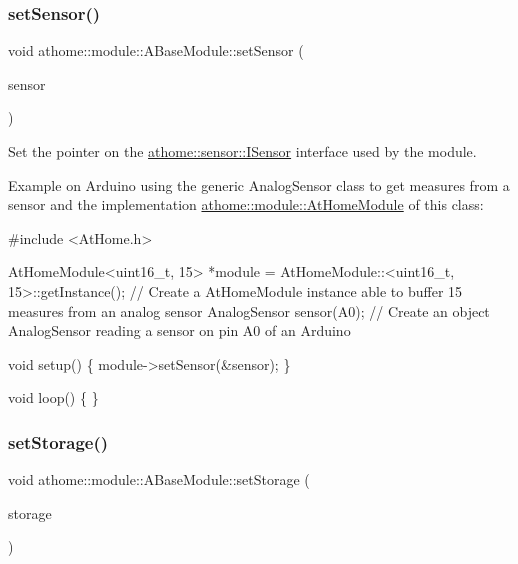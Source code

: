 \subsubsection{\texorpdfstring{set\+Sensor()}{setSensor()}}
{\footnotesize\ttfamily void athome\+::module\+::\+A\+Base\+Module\+::set\+Sensor (\begin{DoxyParamCaption}\item[{\mbox{\hyperlink{classathome_1_1sensor_1_1_i_sensor}{sensor\+::\+I\+Sensor}} $\ast$}]{sensor }\end{DoxyParamCaption})}

Set the pointer on the \mbox{\hyperlink{classathome_1_1sensor_1_1_i_sensor}{athome\+::sensor\+::\+I\+Sensor}} interface used by the module.

Example on Arduino using the generic Analog\+Sensor class to get measures from a sensor and the implementation \mbox{\hyperlink{classathome_1_1module_1_1_at_home_module}{athome\+::module\+::\+At\+Home\+Module}} of this class\+:


\begin{DoxyCode}
\textcolor{preprocessor}{#include <AtHome.h>}

AtHomeModule<uint16\_t, 15> *module = AtHomeModule::<uint16\_t, 15>::getInstance(); \textcolor{comment}{// Create a AtHomeModule
       instance able to buffer 15 measures from an analog sensor}
AnalogSensor sensor(A0); \textcolor{comment}{// Create an object AnalogSensor reading a sensor on pin A0 of an Arduino}

\textcolor{keywordtype}{void} setup() \{
  module->setSensor(&sensor);
\}

\textcolor{keywordtype}{void} loop() \{
\}
\end{DoxyCode}
 \mbox{\label{classathome_1_1module_1_1_a_base_module_a91e714579636e6f4a3628a23a8ba61e7}} 
\subsubsection{\texorpdfstring{set\+Storage()}{setStorage()}}
{\footnotesize\ttfamily void athome\+::module\+::\+A\+Base\+Module\+::set\+Storage (\begin{DoxyParamCaption}\item[{\mbox{\hyperlink{classathome_1_1storage_1_1_i_storage}{storage\+::\+I\+Storage}} $\ast$}]{storage }\end{DoxyParamCaption})}

